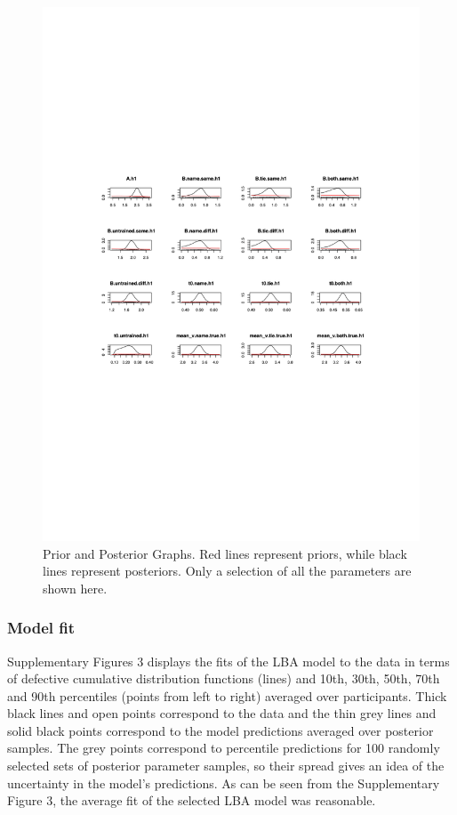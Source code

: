 \documentclass[
  man,floatsintext]{apa6}
\begin{document}
\begin{figure}[H]

{\centering \includegraphics[height=0.67\textheight,]{../../figures/ea/pp} 

}

\caption{Prior and Posterior Graphs. Red lines represent priors, while black lines represent posteriors. Only a selection of all the parameters are shown here.}\label{fig:prior-post-plot}
\end{figure}

\subsubsection{Model fit}\label{model-fit}

Supplementary Figures 3 displays the fits of the LBA model to the data in terms of defective cumulative distribution functions (lines) and 10th, 30th, 50th, 70th and 90th percentiles (points from left to right) averaged over participants. Thick black lines and open points correspond to the data and the thin grey lines and solid black points correspond to the model predictions averaged over posterior samples. The grey points correspond to percentile predictions for 100 randomly selected sets of posterior parameter samples, so their spread gives an idea of the uncertainty in the model's predictions. As can be seen from the Supplementary Figure 3, the average fit of the selected LBA model was reasonable.
\end{document}
